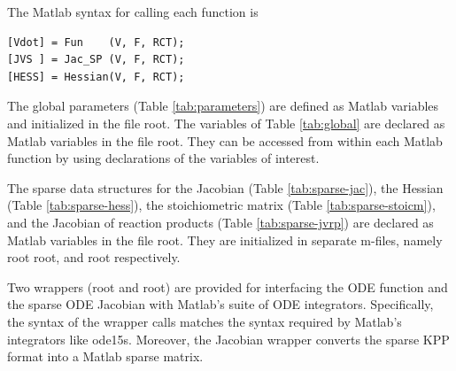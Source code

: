 \documentclass[twoside]{article}
\newcommand{\kpproot}{{\sc root}}
\begin{document}
The Matlab syntax for calling each function is
%
\begin{verbatim}
[Vdot] = Fun    (V, F, RCT);
[JVS ] = Jac_SP (V, F, RCT);
[HESS] = Hessian(V, F, RCT);
\end{verbatim}
%
The global parameters (Table \ref{tab:parameters}) are defined as Matlab
 variables and initialized in the file
\kpproot{}. The variables of Table
\ref{tab:global} are declared as Matlab  variables in the
file \kpproot{}. They can be accessed from within
each Matlab function by using  declarations of the
variables of interest.

The sparse data structures for the Jacobian (Table
\ref{tab:sparse-jac}), the Hessian (Table \ref{tab:sparse-hess}), the
stoichiometric matrix (Table \ref{tab:sparse-stoicm}), and the Jacobian
of reaction products (Table \ref{tab:sparse-jvrp}) are declared as
Matlab  variables in the file
\kpproot{}. They are initialized in separate m-files,
namely \kpproot{}
\kpproot{}, and
\kpproot{} respectively.

Two wrappers (\kpproot{} and
\kpproot{}) are provided for interfacing the ODE
function and the sparse ODE Jacobian with Matlab's suite of ODE
integrators. Specifically, the syntax of the wrapper calls matches the
syntax required by Matlab's integrators like ode15s. Moreover, the
Jacobian wrapper converts the sparse KPP format into a Matlab sparse
matrix.
\end{document}
